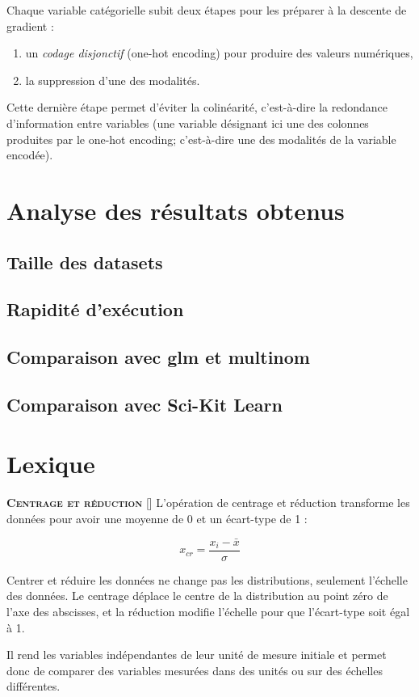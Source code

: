 \documentclass[10pt,french]{report}
\newcommand{\entreelex}[3][]{%
	{\large \textbf{\textsc{#2}}} %
	\if\relax\detokenize{#1}\relax %
	\else %
	\raisebox{0.15ex}{\scalebox{0.7}{$\Diamond$}} %
	[#1] %
	\fi
	\raisebox{0.13ex}{\scalebox{0.75}{$\blacksquare$}} #3 %
}
\begin{document}
	Chaque variable catégorielle subit deux étapes pour les préparer à la descente de gradient :

	\begin{enumerate}
		\item un \textit{codage disjonctif} (one-hot encoding) pour produire des valeurs numériques,
		\item la suppression d'une des modalités.
	\end{enumerate}

	Cette dernière étape permet d'éviter la colinéarité, c'est-à-dire la redondance d'information entre variables (une variable désignant ici une des colonnes produites par le one-hot encoding; c'est-à-dire une des modalités de la variable encodée).

    \chapter{Analyse des résultats obtenus}

    \section{Taille des datasets}

    \section{Rapidité d'exécution}

    \section{Comparaison avec glm et multinom}

    \section{Comparaison avec Sci-Kit Learn}

	\chapter{Lexique}

	\label{Centrage et réduction}
	\entreelex{Centrage et réduction}{L'opération de centrage et réduction transforme les données pour avoir une moyenne de 0 et un écart-type de 1 :

	\begin{equation}
		x_{cr}=\frac{x_{i}-\bar{x}}{\sigma}
	\end{equation}

	 Centrer et réduire les données ne change pas les distributions, seulement l'échelle des données. Le centrage déplace le centre de la distribution au point zéro de l'axe des abscisses, et la réduction modifie l'échelle pour que l'écart-type soit égal à 1.

	 Il rend les variables indépendantes de leur unité de mesure initiale et permet donc de comparer des variables mesurées dans des unités ou sur des échelles différentes.}
\end{document}
